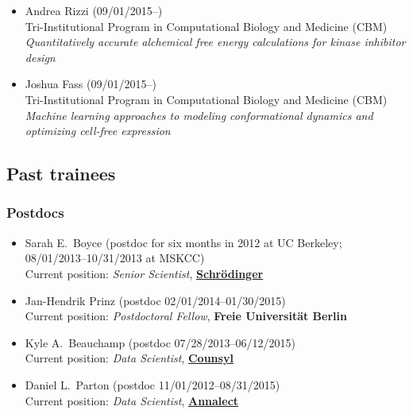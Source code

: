 \documentclass[10pt]{article}
\begin{document}
\begin{itemize}
  \item Andrea Rizzi (09/01/2015--)\\
  Tri-Institutional Program in Computational Biology and Medicine (CBM)\\
  \emph{Quantitatively accurate alchemical free energy calculations for kinase inhibitor design}

  \item Joshua Fass (09/01/2015--)\\
  Tri-Institutional Program in Computational Biology and Medicine (CBM)\\
  \emph{Machine learning approaches to modeling conformational dynamics and optimizing cell-free expression}
  
\end{itemize}

\eject

\subsection*{Past trainees}

\subsubsection*{Postdocs}

\begin{itemize}
  \item Sarah E.~Boyce (postdoc for six months in 2012 at UC Berkeley;\\
  08/01/2013--10/31/2013 at MSKCC)\\
  Current position: \emph{Senior Scientist},  \href{http://www.schrodinger.com}{{\bf Schr\"{o}dinger}}
  
  \item Jan-Hendrik Prinz (postdoc 02/01/2014--01/30/2015)\\
  Current position: \emph{Postdoctoral Fellow}, {\bf Freie Universit\"{a}t Berlin}
  
  \item Kyle A.~Beauchamp (postdoc 07/28/2013--06/12/2015)\\
  Current position: \emph{Data Scientist}, \href{http://www.schrodinger.com}{{\bf Counsyl}}
  
  \item Daniel L.~Parton (postdoc 11/01/2012--08/31/2015)\\
  Current position: \emph{Data Scientist}, \href{http://www.annalect.com}{{\bf Annalect}}
  
\end{itemize}
\end{document}
